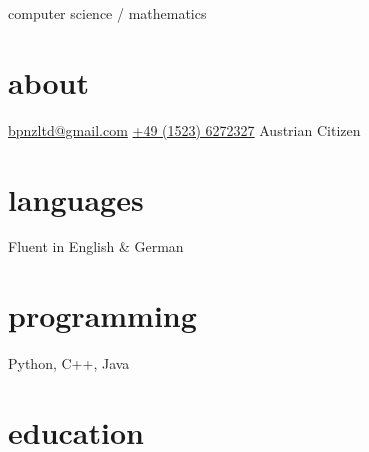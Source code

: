 \documentclass[]{boris-cv}
\begin{document}
       {computer science / mathematics}

\begin{aside}
  \section{about}
    \href{mailto:bpnzltd@gmail.com}{bpnzltd@gmail.com}
    \href{tel:+4915236272327}{+49 (1523) 6272327}
	 Austrian Citizen
  \section{languages}
    Fluent in
    English \& German
  \section{programming}
    Python, C++, Java
\end{aside}

%
%
%
\section{education}
\end{document}
